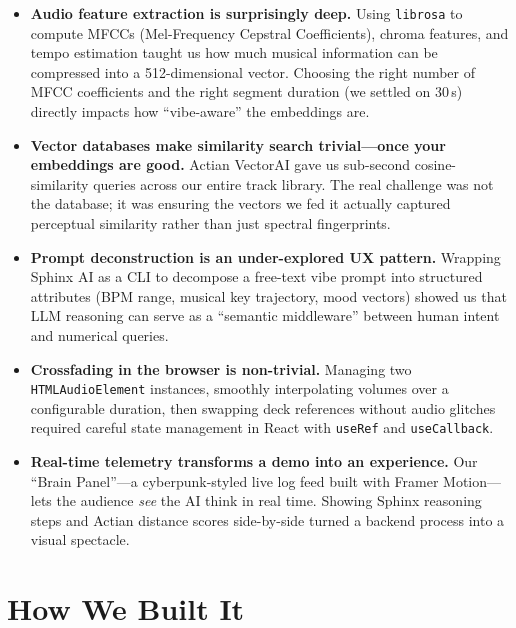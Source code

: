 \documentclass[11pt,a4paper]{article}
\begin{document}
\begin{itemize}[leftmargin=1.5em]
  \item \textbf{Audio feature extraction is surprisingly deep.}
        Using \texttt{librosa} to compute MFCCs (Mel-Frequency Cepstral Coefficients), chroma features, and tempo estimation taught us how much musical information can be compressed into a 512-dimensional vector.
        Choosing the right number of MFCC coefficients and the right segment duration (we settled on 30\,s) directly impacts how ``vibe-aware'' the embeddings are.

  \item \textbf{Vector databases make similarity search trivial---once your embeddings are good.}
        Actian VectorAI gave us sub-second cosine-similarity queries across our entire track library.
        The real challenge was not the database; it was ensuring the vectors we fed it actually captured perceptual similarity rather than just spectral fingerprints.

  \item \textbf{Prompt deconstruction is an under-explored UX pattern.}
        Wrapping Sphinx AI as a CLI to decompose a free-text vibe prompt into structured attributes (BPM range, musical key trajectory, mood vectors) showed us that LLM reasoning can serve as a ``semantic middleware'' between human intent and numerical queries.

  \item \textbf{Crossfading in the browser is non-trivial.}
        Managing two \texttt{HTMLAudioElement} instances, smoothly interpolating volumes over a configurable duration, then swapping deck references without audio glitches required careful state management in React with \texttt{useRef} and \texttt{useCallback}.

  \item \textbf{Real-time telemetry transforms a demo into an experience.}
        Our ``Brain Panel''---a cyberpunk-styled live log feed built with Framer Motion---lets the audience \emph{see} the AI think in real time. Showing Sphinx reasoning steps and Actian distance scores side-by-side turned a backend process into a visual spectacle.
\end{itemize}

\section{How We Built It}
\end{document}
